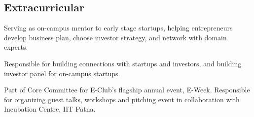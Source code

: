 \documentclass[]{deedy}
\begin{document}
\begin{minipage}[t]{0.72\textwidth}
\begin{flushleft}
\section{Extracurricular}
%
\begin{tightemize}
\item Serving as on-campus mentor to early stage startups, helping entrepreneurs develop business plan, choose investor strategy, and network with domain experts.
\item Responsible for building connections with startups and investors, and building investor panel for on-campus startups.
\item Part of Core Committee for E-Club’s flagship annual event, E-Week. Responsible for organizing guest talks, workshops and pitching event in collaboration with Incubation Centre, IIT Patna.
\end{tightemize}
\sectionsep
%
\end{flushleft}
\end{minipage}
\end{document}
